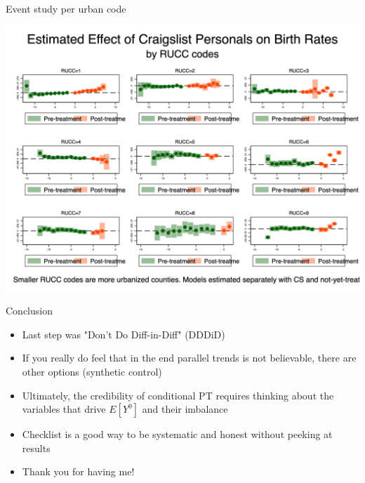 \documentclass{beamer}
\begin{document}
\begin{frame}{Event study per urban code}


    \begin{center}
        \includegraphics[width=0.75\linewidth,keepaspectratio]{./lecture_includes/es_br1544_RUCCcombined.png}
    \end{center}
\end{frame}







\begin{frame}{Conclusion}

\begin{itemize}

\item Last step was "Don't Do Diff-in-Diff" (DDDiD) 
\item If you really do feel that in the end parallel trends is not believable, there are other options (synthetic control)
\item Ultimately, the credibility of conditional PT requires thinking about the variables that drive $E[Y^0]$ and their imbalance
\item Checklist is a good way to be systematic and honest without peeking at results
\item Thank you for having me!

\end{itemize}

\end{frame}
\end{document}
